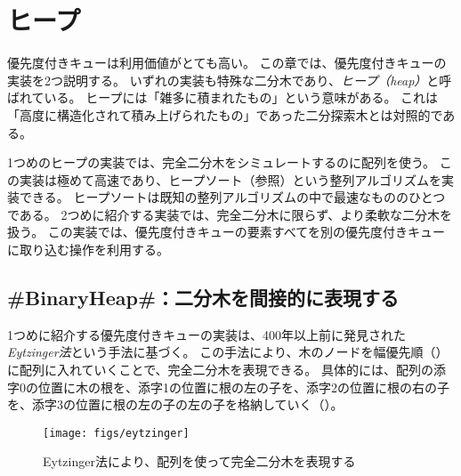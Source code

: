 \chapter{ヒープ}
優先度付きキューは利用価値がとても高い。
この章では、優先度付きキューの実装を2つ説明する。
いずれの実装も特殊な二分木であり、\emph{ヒープ（heap）}と呼ばれている。
%
%
%
ヒープには「雑多に積まれたもの」という意味がある。
これは「高度に構造化されて積み上げられたもの」であった二分探索木とは対照的である。

1つめのヒープの実装では、完全二分木をシミュレートするのに配列を使う。
この実装は極めて高速であり、ヒープソート（参照）という整列アルゴリズムを実装できる。
ヒープソートは既知の整列アルゴリズムの中で最速なもののひとつである。
2つめに紹介する実装では、完全二分木に限らず、より柔軟な二分木を扱う。
この実装では、優先度付きキューの要素すべてを別の優先度付きキューに取り込む操作を利用する。 %

\section{#BinaryHeap#：二分木を間接的に表現する} %

%
1つめに紹介する優先度付きキューの実装は、400年以上前に発見された\emph{Eytzinger法}という手法に基づく。
%
この手法により、木のノードを幅優先順（）に配列に入れていくことで、完全二分木を表現できる。
具体的には、配列の添字0の位置に木の根を、添字1の位置に根の左の子を、添字2の位置に根の右の子を、添字3の位置に根の左の子の左の子を格納していく（）。

\begin{figure}
  \begin{center}
    \texttt{[image: figs/eytzinger]}
  \end{center}
  \caption{Eytzinger法により、配列を使って完全二分木を表現する}
\end{figure}

